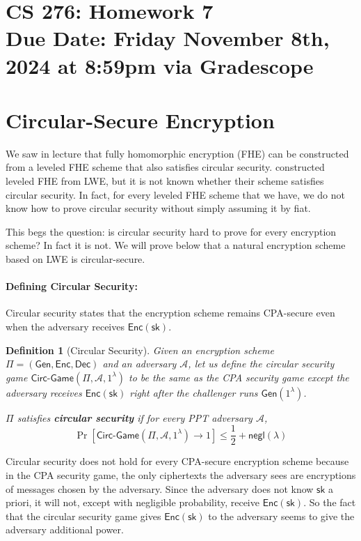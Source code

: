\documentclass[11pt]{article}
\newtheorem{definition}[theorem]{Definition}
\numberwithin{equation}{section}
\newcommand{\cA}{\mathcal{A}}
\newcommand{\Gen}{\mathsf{Gen}}
\newcommand{\Enc}{\mathsf{Enc}}
\newcommand{\Dec}{\mathsf{Dec}}
\newcommand{\sk}{\mathsf{sk}}
\newcommand{\secp}{\lambda}
\newcommand{\negl}{\mathsf{negl}}
\newcommand{\duedate}{Friday November 8th, 2024 at 8:59pm via Gradescope}
\begin{document}
\section*{CS 276: Homework 7\\ {\small Due Date: \duedate} }

\section{Circular-Secure Encryption}
We saw in lecture that fully homomorphic encryption (FHE) can be constructed from a leveled FHE scheme that also satisfies circular security. \cite{BGV11} constructed leveled FHE from LWE, but it is not known whether their scheme satisfies circular security. In fact, for every leveled FHE scheme that we have, we do not know how to prove circular security without simply assuming it by fiat.

This begs the question: is circular security hard to prove for every encryption scheme? In fact it is not. We will prove below that a natural encryption scheme based on LWE is circular-secure.

\paragraph{Defining Circular Security:} Circular security states that the encryption scheme remains CPA-secure even when the adversary receives $\Enc(\sk)$. 

\begin{definition}[Circular Security]\label{def:circular-security}
Given an encryption scheme $\Pi = (\Gen, \Enc, \Dec)$ and an adversary $\cA$, let us define the circular security game $\mathsf{Circ\text{-}Game}(\Pi, \cA, 1^\secp)$ to be the same as the CPA security game except the adversary receives $\Enc(\sk)$ right after the challenger runs $\Gen(1^\secp)$.

$\Pi$ satisfies \textbf{circular security} if for every PPT adversary $\cA$,
\[\Pr[\mathsf{Circ\text{-}Game}(\Pi, \cA, 1^\secp) \to 1] \leq \frac{1}{2} + \negl(\secp)\]
\end{definition}

Circular security does not hold for every CPA-secure encryption scheme because in the CPA security game, the only ciphertexts the adversary sees are encryptions of messages chosen by the adversary. Since the adversary does not know $\sk$ a priori, it will not, except with negligible probability, receive $\Enc(\sk)$. So the fact that the circular security game gives $\Enc(\sk)$ to the adversary seems to give the adversary additional power.
\end{document}
